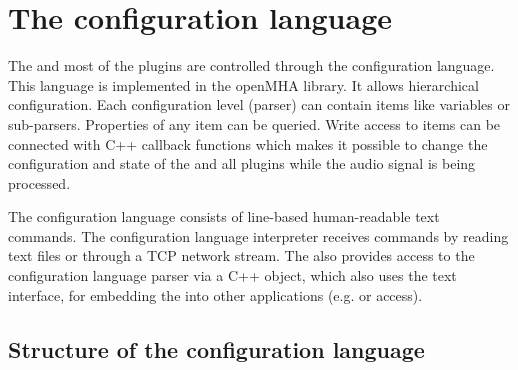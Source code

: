 

\section{The \mha{} configuration language}
\label{sec:script}

The \mhad{} and most of the \mha{} plugins are controlled
through the \mha{} configuration language. This language is implemented in the
openMHA library. It allows hierarchical configuration. 
Each configuration level (parser)
can contain items like variables or sub-parsers. Properties of any item can be
queried.  Write access to items can be connected with C++ callback functions
which makes it possible to change the configuration and state of the \mha{} 
and all plugins while the audio signal is being processed.

The \mha{} configuration language consists of line-based human-readable
text commands.
The \mha{} configuration language interpreter receives commands by
reading text files or through a TCP network stream.  
The \mha{} also provides access to the configuration language parser via
a C++ object, 
which also uses the text interface,
for embedding the \mha{} into other applications (e.g. \Octave or \Matlab{} access).

\subsection{Structure of the \mha{} configuration language}

